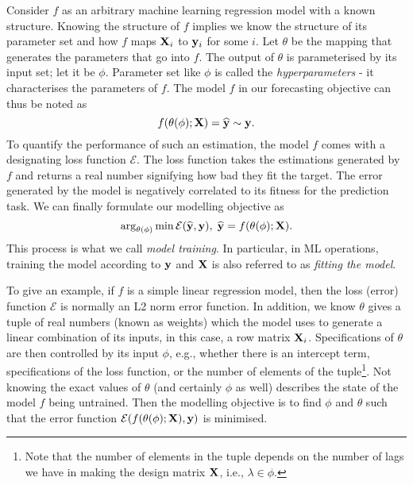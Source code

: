 Consider $f$ as an arbitrary machine learning regression model with a known structure. Knowing the structure of $f$ implies we know the structure of its parameter set and how $f$ maps $\mathbf{X}_i$ to $\mathbf{y}_i$ for some $i$. Let $\theta$ be the mapping that generates the parameters that go into $f$. The output of $\theta$ is parameterised by its input set; let it be $\phi$. Parameter set like $\phi$ is called the \textit{hyperparameters} - it characterises the parameters of $f$. The model $f$ in our forecasting objective can thus be noted as
\begin{equation*}
    f(\theta(\phi); \mathbf{X}) = \widehat{\mathbf{y}} \sim \mathbf{y}.
\end{equation*}
To quantify the performance of such an estimation, the model $f$ comes with a designating loss function $\mathcal{E}$. The loss function takes the estimations generated by $f$ and returns a real number signifying how bad they fit the target. The error generated by the model is negatively correlated to its fitness for the prediction task. We can finally formulate our modelling objective as
\begin{equation}\label{eq: ml training}
    \arg_{\theta(\phi)} \min \mathcal{E}(\widehat{\mathbf{y}}, \mathbf{y}), \; \widehat{\mathbf{y}} = f(\theta(\phi); \mathbf{X}).
\end{equation}
This process is what we call \textit{model training}. In particular, in ML operations, training the model according to $\mathbf{y}$ and $\mathbf{X}$ is also referred to as \textit{fitting the model}.

To give an example, if $f$ is a simple linear regression model, then the loss (error) function $\mathcal{E}$ is normally an L2 norm error function. In addition, we know $\theta$ gives a tuple of real numbers (known as weights) which the model uses to generate a linear combination of its inputs, in this case, a row matrix $\mathbf{X}_i$. Specifications of $\theta$ are then controlled by its input $\phi$, e.g., whether there is an intercept term, specifications of the loss function, or the number of elements of the tuple\footnote{Note that the number of elements in the tuple depends on the number of lags we have in making the design matrix $\mathbf{X}$, i.e., $\lambda \in \phi$.}. Not knowing the exact values of $\theta$ (and certainly $\phi$ as well) describes the state of the model $f$ being untrained. Then the modelling objective is to find $\phi$ and $\theta$ such that the error function $\mathcal{E}(f(\theta(\phi); \mathbf{X}), \mathbf{y})$ is minimised.

